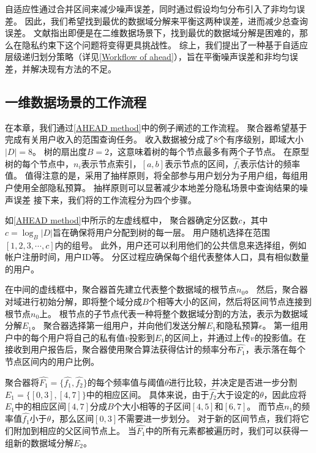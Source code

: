 自适应性通过合并区间来减少噪声误差，同时通过假设均匀分布引入了非均匀误差。
因此，我们希望找到最优的数据域分解来平衡这两种误差，进而减少总查询误差。
文献\cite{muthukrishnan1999rectangular}指出即便是在二维数据场景下，找到最优的数据域分解是困难的，那么在隐私约束下这个问题将变得更具挑战性。 
综上，我们提出了一种基于自适应层级递归划分策略（详见\autoref{Workflow of ahead}），旨在平衡噪声误差和非均匀误差，并解决现有方法的不足。

\subsection{一维数据场景\myahead 的工作流程}
\label{Workflow of ahead}
在本章，我们通过\autoref{AHEAD method}中的例子阐述\myahead 的工作流程。
聚合器希望基于\myahead 完成有关用户收入的范围查询任务。
收入数据被分成了8个有序级别，即域大小$|D|=8$。
树的扇出度$B=2$，这意味着\myahead 树的每个节点最多有两个子节点。
在\myahead 原型树的每个节点中，$n_i$表示节点索引，$[a,b]$表示节点的区间，$\hat{f_i}$表示估计的频率值。
值得注意的是，\myahead 采用了抽样原则\cite{cormode2019answering}，将全部参与用户划分为子用户组，每组用户使用全部隐私预算。
抽样原则可以显著减少本地差分隐私场景中查询结果的噪声误差\cite{nguyen2016collecting, wang2017locally, wang2019locally}
接下来，我们将\myahead 的工作流程分为四个步骤。


如\autoref{AHEAD method}中所示的左虚线框中，
聚合器确定分区数$c$，其中$c=\log_B|D|$旨在确保将用户分配到\myahead 树的每一层。
用户随机选择在范围$[1,2,3,\cdots,c]$内的组号。
此外，用户还可以利用他们的公共信息来选择组，例如帐户注册时间，用户ID等。
分区过程应确保每个组代表整体人口，具有相似数量的用户。


在中间的虚线框中，聚合器首先建立代表整个数据域的根节点$n_0$。
然后，聚合器对域进行初始分解，即将整个域分成$B$个相等大小的区间，然后将区间节点连接到根节点$n_0$上。
根节点的子节点代表一种将整个数据域分割的方法，表示为数据域分解$E_1$。
聚合器选择第一组用户，并向他们发送分解$E_1$和隐私预算$\epsilon$。
第一组用户中的每个用户将自己的私有值$v$投影到$E_1$的区间上，并通过\oue 上传$v$的投影值。在接收到用户报告后，聚合器使用聚合算法获得估计的频率分布$\hat{F_1}$，表示落在每个节点区间内的用户比例。


聚合器将$\hat{F_1}=\{\hat{f_1}, \hat{f_2}\}$的每个频率值与阈值$\theta$进行比较，并决定是否进一步分割$E_1=\{[0,3], [4,7]\}$中的相应区间。
具体来说，由于$\hat{f_2}$大于设定的$\theta$，因此应将$E_1$中的相应区间$[4,7]$分成$B$个大小相等的子区间$[4,5]$和$[6,7]$。
而节点$n_1$的频率值$\hat{f_1}$小于$\theta$，那么区间$[0,3]$不需要进一步划分。
对于新的区间节点，我们将它们附加到相应的父区间节点上。
当$\hat{F_1}$中的所有元素都被遍历时，我们可以获得一组新的数据域分解$E_{2}$。

